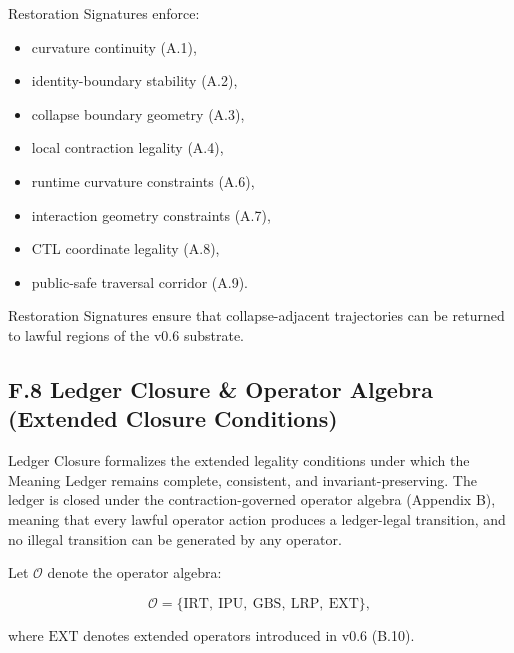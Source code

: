 \medskip

\noindent Restoration Signatures enforce:

\begin{itemize}
    \item curvature continuity (A.1),
    \item identity-boundary stability (A.2),
    \item collapse boundary geometry (A.3),
    \item local contraction legality (A.4),
    \item runtime curvature constraints (A.6),
    \item interaction geometry constraints (A.7),
    \item CTL coordinate legality (A.8),
    \item public-safe traversal corridor (A.9).
\end{itemize}

\medskip

\noindent Restoration Signatures ensure that collapse-adjacent trajectories can
be returned to lawful regions of the v0.6 substrate.



\subsection*{F.8 Ledger Closure & Operator Algebra (Extended Closure Conditions)}

\noindent Ledger Closure formalizes the extended legality conditions under which
the Meaning Ledger remains complete, consistent, and invariant-preserving. The
ledger is closed under the contraction-governed operator algebra (Appendix B),
meaning that every lawful operator action produces a ledger-legal transition,
and no illegal transition can be generated by any operator.

\medskip

\noindent Let $\mathcal{O}$ denote the operator algebra:


\[
\mathcal{O} = \{ \mathrm{IRT},\ \mathrm{IPU},\ \mathrm{GBS},\ \mathrm{LRP},\ \mathrm{EXT} \},
\]


where $\mathrm{EXT}$ denotes extended operators introduced in v0.6 (B.10).

\medskip

